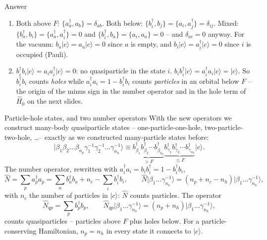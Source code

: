 \documentclass[aspectratio=169,10pt]{beamer}
\newcounter{thinkctr}
\newcommand{\thinka}[1]{%
  \begin{tcolorbox}[colback=paleteal,colframe=teal,title={\bfseries Answer to pause \#\thethinkctr}]
  #1
  \end{tcolorbox}}
\newcommand{\ket}[1]{\vert #1\rangle}
\begin{document}
\begin{frame}{Answer}
  \thinka{
  \begin{enumerate}
    \item Both above $F$: $\{a_a^{\dagger},a_b\}=\delta_{ab}$. Both below: $\{b_i^{\dagger},b_j\}=\{a_i,a_j^{\dagger}\}=\delta_{ij}$. Mixed: $\{b_a^{\dagger},b_i\}=\{a_a^{\dagger},a_i^{\dagger}\}=0$ and $\{b_i^{\dagger},b_a\}=\{a_i,a_a\}=0$ -- and $\delta_{ai}=0$ anyway. For the vacuum: $b_a\ket{c}=a_a\ket{c}=0$ since $a$ is empty, and $b_i\ket{c}=a_i^{\dagger}\ket{c}=0$ since $i$ is occupied (Pauli).
    \item $b_i^{\dagger}b_i\ket{c}=a_ia_i^{\dagger}\ket{c}=0$: no quasiparticle in the state $i$. $b_ib_i^{\dagger}\ket{c}=a_i^{\dagger}a_i\ket{c}=\ket{c}$. So $b_i^{\dagger}b_i$ counts \emph{holes} while $a_i^{\dagger}a_i=1-b_i^{\dagger}b_i$ counts \emph{particles} in an orbital below $F$ -- the origin of the minus sign in the number operator and in the hole term of $\hat{H}_0$ on the next slides.
  \end{enumerate}}
\end{frame}

\begin{frame}{Particle-hole states, and two number operators}
  With the new operators we construct many-body quasiparticle states -- one-particle-one-hole, two-particle-two-hole, \dots -- exactly as we constructed many-particle states before:
  \[
    \ket{\beta_1\beta_2\dots\beta_{n_p}\gamma_1^{-1}\gamma_2^{-1}\dots\gamma_{n_h}^{-1}}
    \equiv\underbrace{b_{\beta_1}^{\dagger}b_{\beta_2}^{\dagger}\cdots b_{\beta_{n_p}}^{\dagger}}_{>F}
    \underbrace{b_{\gamma_1}^{\dagger}b_{\gamma_2}^{\dagger}\cdots b_{\gamma_{n_h}}^{\dagger}}_{\le F}\ket{c}.
  \]
  The number operator, rewritten with $a_i^{\dagger}a_i=b_ib_i^{\dagger}=1-b_i^{\dagger}b_i$,
  \[
    \hat{N}=\sum_pa_p^{\dagger}a_p
    =\sum_{a}b_a^{\dagger}b_a+n_c-\sum_{i}b_i^{\dagger}b_i,
    \qquad
    \hat{N}\ket{\beta_1\dots\gamma_{n_h}^{-1}}=(n_p+n_c-n_h)\ket{\beta_1\dots\gamma_{n_h}^{-1}},
  \]
  with $n_c$ the number of particles in $\ket{c}$: $\hat{N}$ counts \alert{particles}. The operator
  \[
    \hat{N}_{qp}=\sum_pb_p^{\dagger}b_p,
    \qquad
    \hat{N}_{qp}\ket{\beta_1\dots\gamma_{n_h}^{-1}}=(n_p+n_h)\ket{\beta_1\dots\gamma_{n_h}^{-1}},
  \]
  counts \alert{quasiparticles} -- particles above $F$ plus holes below. For a particle-conserving Hamiltonian, $n_p=n_h$ in every state it connects to $\ket{c}$.
\end{frame}
\end{document}
